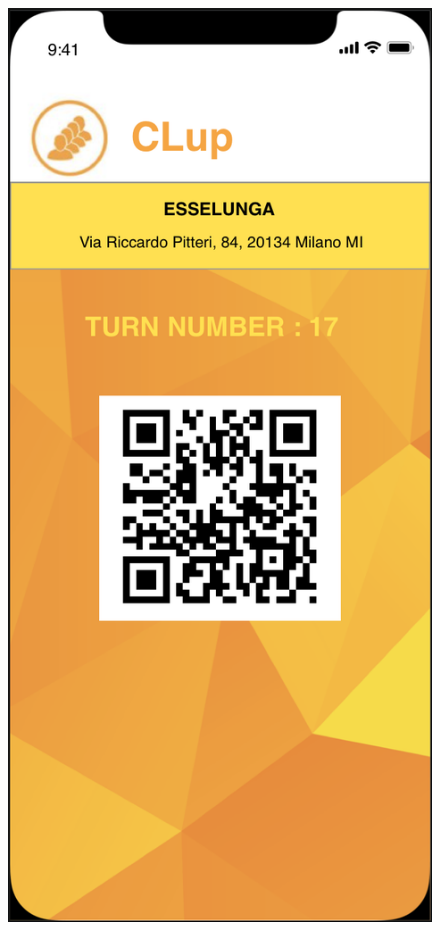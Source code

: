 \documentclass{article}
\begin{document}
\begin{figure}[H]
\begin{minipage}[b]{0.4\textwidth}
\centering
\includegraphics[width=\textwidth]{QRcode.png}

\end{minipage}
\end{figure}
\end{document}
